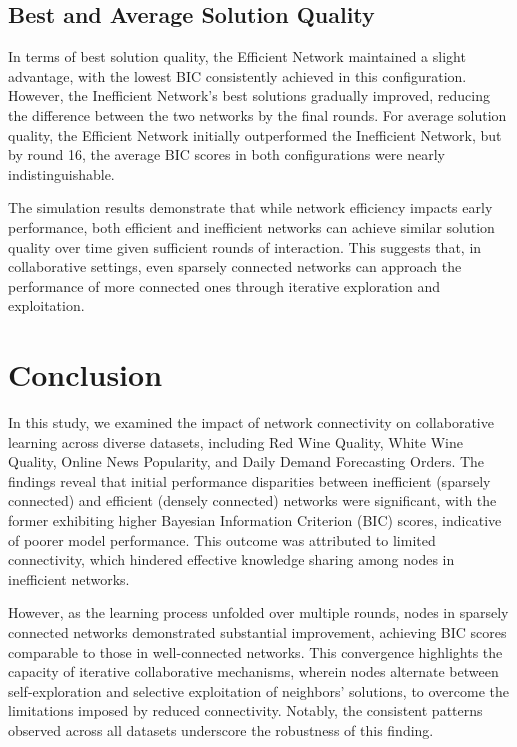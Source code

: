 \documentclass[conference]{IEEEtran}
\begin{document}
\subsection{Best and Average Solution Quality}
In terms of best solution quality, the Efficient Network maintained a slight advantage, with the lowest BIC consistently achieved in this configuration. However, the Inefficient Network's best solutions gradually improved, reducing the difference between the two networks by the final rounds. For average solution quality, the Efficient Network initially outperformed the Inefficient Network, but by round 16, the average BIC scores in both configurations were nearly indistinguishable.

The simulation results demonstrate that while network efficiency impacts early performance, both efficient and inefficient networks can achieve similar solution quality over time given sufficient rounds of interaction. This suggests that, in collaborative settings, even sparsely connected networks can approach the performance of more connected ones through iterative exploration and exploitation.

\section{Conclusion}

In this study, we examined the impact of network connectivity on collaborative learning across diverse datasets, including Red Wine Quality, White Wine Quality, Online News Popularity, and Daily Demand Forecasting Orders. The findings reveal that initial performance disparities between inefficient (sparsely connected) and efficient (densely connected) networks were significant, with the former exhibiting higher Bayesian Information Criterion (BIC) scores, indicative of poorer model performance. This outcome was attributed to limited connectivity, which hindered effective knowledge sharing among nodes in inefficient networks.

However, as the learning process unfolded over multiple rounds, nodes in sparsely connected networks demonstrated substantial improvement, achieving BIC scores comparable to those in well-connected networks. This convergence highlights the capacity of iterative collaborative mechanisms, wherein nodes alternate between self-exploration and selective exploitation of neighbors’ solutions, to overcome the limitations imposed by reduced connectivity. Notably, the consistent patterns observed across all datasets underscore the robustness of this finding.
\end{document}
